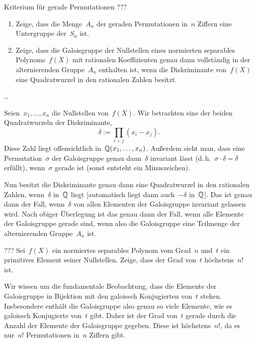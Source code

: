 \documentclass{algblatt}
\begin{document}
\begin{aufgabe}{Kriterium für gerade Permutationen ???}
\begin{enumerate}
\item Zeige, dass die Menge~$A_n$ der geraden Permutationen in~$n$ Ziffern eine
Untergruppe der~$S_n$ ist.

\item Zeige, dass die Galoisgruppe der Nullstellen eines normierten separables
Polynoms~$f(X)$ mit rationalen Koeffizienten genau dann vollständig in der
alternierenden Gruppe~$A_n$ enthalten ist, wenn die Diskriminante von~$f(X)$
eine Quadratwurzel in den rationalen Zahlen besitzt.
\end{enumerate}

\begin{loesungE}
\item \ldots

\item Seien~$x_1, \ldots, x_n$ die Nullstellen von~$f(X)$. Wir betrachten eine
der beiden Quadratwurzeln der Diskriminante,
\[ \delta := \prod_{i < j} (x_i - x_j). \]
Diese Zahl liegt offensichtlich in~$\mathbb{Q}(x_1,\ldots,x_n)$. Außerdem sieht man,
dass eine Permutation~$\sigma$ der Galoisgruppe genau dann~$\delta$ invariant
lässt (d.\,h.~$\sigma \cdot \delta = \delta$ erfüllt), wenn~$\sigma$ gerade
ist (sonst entsteht ein Minuszeichen).

Nun besitzt die Diskriminante genau dann eine Quadratwurzel in den rationalen
Zahlen, wenn~$\delta$ in~$\mathbb{Q}$ liegt [automatisch liegt dann auch~$-\delta$
in~$\mathbb{Q}$]. Das ist genau dann der Fall, wenn~$\delta$ von allen Elementen der
Galoisgruppe invariant gelassen wird. Nach obiger Überlegung ist das genau dann
der Fall, wenn alle Elemente der Galoisgruppe gerade sind, wenn also die
Galoisgruppe eine Teilmenge der alternierenden Gruppe~$A_n$ ist.
\end{loesungE}
\end{aufgabe}

\begin{aufgabe}{???}
Sei~$f(X)$ ein normiertes separables Polynom vom Grad~$n$ und~$t$ ein
primitives Element seiner Nullstellen. Zeige, dass der Grad von~$t$
höchstens~$n!$ ist.

\begin{loesung}
Wir wissen um die fundamentale Beobachtung, dass die Elemente der
Galoisgruppe in Bijektion mit den galoissch Konjugierten von~$t$ stehen.
Insbesondere enthält die Galoisgruppe also genau so viele Elemente, wie es
galoissch Konjugierte von~$t$ gibt. Daher ist der Grad von~$t$ gerade durch
die Anzahl der Elemente der Galoisgruppe gegeben. Diese ist höchstens~$n!$, da
es nur~$n!$ Permutationen in~$n$ Ziffern gibt.
\end{loesung}
\end{aufgabe}
\end{document}
